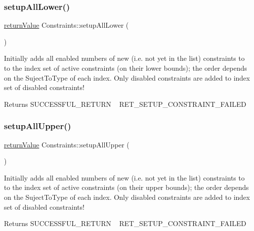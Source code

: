 \subsubsection{\texorpdfstring{setup\+All\+Lower()}{setupAllLower()}}
{\footnotesize\ttfamily \hyperlink{_message_handling_8hpp_a81d556f613bfbabd0b1f9488c0fa865e}{return\+Value} Constraints\+::setup\+All\+Lower (\begin{DoxyParamCaption}{ }\end{DoxyParamCaption})}

Initially adds all enabled numbers of new (i.\+e. not yet in the list) constraints to to the index set of active constraints (on their lower bounds); the order depends on the Suject\+To\+Type of each index. Only disabled constraints are added to index set of disabled constraints! \begin{DoxyReturn}{Returns}
S\+U\+C\+C\+E\+S\+S\+F\+U\+L\+\_\+\+R\+E\+T\+U\+RN ~\newline
 R\+E\+T\+\_\+\+S\+E\+T\+U\+P\+\_\+\+C\+O\+N\+S\+T\+R\+A\+I\+N\+T\+\_\+\+F\+A\+I\+L\+ED 
\end{DoxyReturn}
\mbox{\label{class_constraints_a883220c48c6ae8d5ff0ef056547f288b}} 
\subsubsection{\texorpdfstring{setup\+All\+Upper()}{setupAllUpper()}}
{\footnotesize\ttfamily \hyperlink{_message_handling_8hpp_a81d556f613bfbabd0b1f9488c0fa865e}{return\+Value} Constraints\+::setup\+All\+Upper (\begin{DoxyParamCaption}{ }\end{DoxyParamCaption})}

Initially adds all enabled numbers of new (i.\+e. not yet in the list) constraints to to the index set of active constraints (on their upper bounds); the order depends on the Suject\+To\+Type of each index. Only disabled constraints are added to index set of disabled constraints! \begin{DoxyReturn}{Returns}
S\+U\+C\+C\+E\+S\+S\+F\+U\+L\+\_\+\+R\+E\+T\+U\+RN ~\newline
 R\+E\+T\+\_\+\+S\+E\+T\+U\+P\+\_\+\+C\+O\+N\+S\+T\+R\+A\+I\+N\+T\+\_\+\+F\+A\+I\+L\+ED 
\end{DoxyReturn}
\mbox{\label{class_constraints_ad0d79440b823d59f69459823bee03f7c}} 
